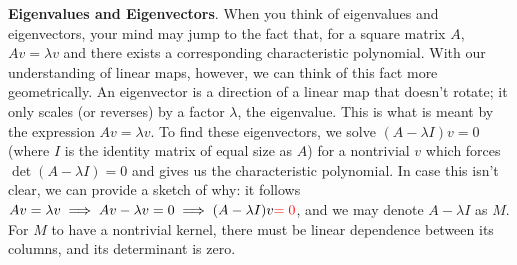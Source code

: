 \documentclass{article}
\begin{document}
\noindent \textbf{Eigenvalues and Eigenvectors}. When you think of eigenvalues and eigenvectors, your mind may jump to the fact that, for a square matrix $A$, $Av=\lambda v$ and there exists a corresponding characteristic polynomial. With our understanding of linear maps, however, we can think of this fact more geometrically. An eigenvector is a direction of a linear map that doesn't rotate; it only scales (or reverses) by a factor $\lambda$, the eigenvalue. This is what is meant by the expression $Av=\lambda v$. To find these eigenvectors, we solve $(A-\lambda I)v=0$ (where $I$ is the identity matrix of equal size as $A$) for a nontrivial $v$ which forces $\det(A-\lambda I)=0$ and gives us the characteristic polynomial. In case this isn't clear, we can provide a sketch of why: it follows $Av=\lambda v \implies Av-\lambda v =0 \implies(A-\lambda I)v \textcolor{red}{= 0}$, and we may denote $A-\lambda I$ as $M$. For $M$ to have a nontrivial kernel, there must be linear dependence between its columns, and its determinant is zero.
\end{document}
